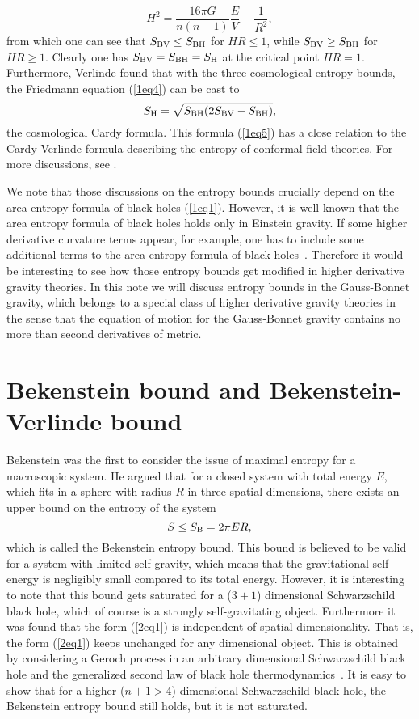 \documentclass[a4paper,12pt]{article}
\newcommand{\sect}[1]{\setcounter{equation}{0}\section{#1}}
\begin{document}
\begin{equation}
\label{1eq4}
H^2 = \frac{16\pi G}{n(n-1)} \frac{E}{V} -\frac{1}{R^2},
\end{equation}
from which one can see that $S_{\rm BV} \le S_{\rm BH}$ for $HR \le 1$,
while $S_{\rm BV} \ge S_{\rm BH}$ for $HR \ge 1$. Clearly one has $S_{\rm BV}=S_{\rm BH}
=S_{\rm H}$ at the critical point $HR=1$. Furthermore, Verlinde found that with the three
cosmological entropy bounds, the Friedmann equation (\ref{1eq4}) can be cast to
\begin{equation}
\label{1eq5}
S_{\rm H}=\sqrt{S_{\rm BH} (2 S_{\rm BV}-S_{\rm BH})},
\end{equation}
the cosmological Cardy formula. This formula (\ref{1eq5}) has a close relation to the
Cardy-Verlinde formula describing the entropy of conformal field theories. For
more discussions, see \cite{Verl}.


We note that those discussions on the entropy bounds crucially depend on the
area entropy formula of black holes (\ref{1eq1}). However, it is well-known
that the area entropy formula of black holes holds only in Einstein gravity.
If some higher derivative curvature terms appear, for example, one has to include some
additional terms to the area entropy formula of black holes~\cite{TM}.
Therefore it would be interesting to see how those entropy bounds get
modified in higher derivative gravity theories. In this note we will discuss entropy
bounds in the  Gauss-Bonnet gravity, which belongs to a special class of higher
derivative gravity theories in the sense that the equation of  motion for the
Gauss-Bonnet gravity  contains no more than second derivatives of metric.



\sect{Bekenstein bound and Bekenstein-Verlinde bound}

Bekenstein was the first to consider the issue of maximal entropy for a
macroscopic system. He argued that for a closed system with total energy $E$,
which fits in a sphere with radius $R$ in three spatial dimensions, there exists an
upper bound on the entropy of the system
\begin{equation}
\label{2eq1}
S \le S_{\rm B} =2 \pi ER,
\end{equation}
which is called the Bekenstein entropy bound.  This bound is believed to be
valid for a system with limited self-gravity, which means that the gravitational
self-energy is negligibly small compared to its total energy. However, it is
interesting to note that this bound gets saturated for a ($3+1$) dimensional
Schwarzschild black hole, which of course is a strongly self-gravitating
object. Furthermore it was found that the form (\ref{2eq1}) is independent of
spatial dimensionality. That is, the form (\ref{2eq1}) keeps unchanged for any
dimensional object. This is obtained by considering a Geroch process in an arbitrary
dimensional Schwarzschild black hole and the generalized second law of black hole
thermodynamics~\cite{Bousso}. It is easy to show that for a higher ($n+1>4$) dimensional
Schwarzschild black hole, the Bekenstein entropy bound still holds, but it is not
saturated.
\end{document}
